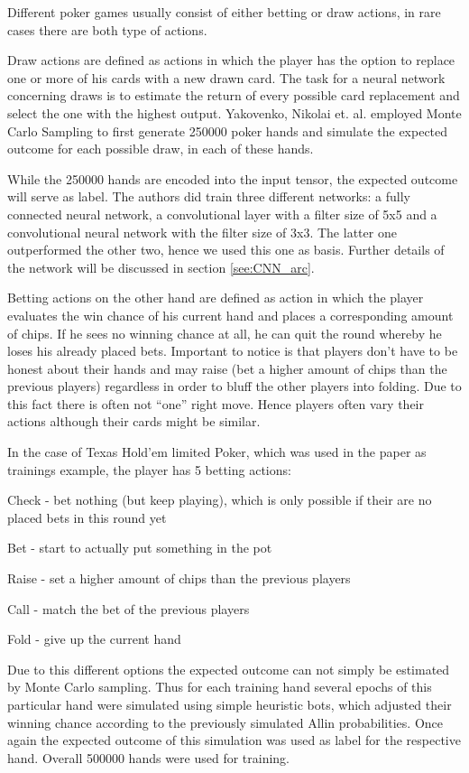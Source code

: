 \documentclass[]{report}
\begin{document}
Different poker games usually consist of either betting or draw actions,
in rare cases there are both type of actions. 

Draw actions are defined as actions in which the player has the option
to replace one or more of his cards with a new drawn card. The task
for a neural network concerning draws is to estimate the return of
every possible card replacement and select the one with the highest
output. Yakovenko, Nikolai et. al. employed Monte Carlo Sampling to
first generate 250000 poker hands and simulate the expected outcome
for each possible draw, in each of these hands.

While the 250000 hands are encoded into the input tensor, the expected
outcome will serve as label. The authors did train three different
networks: a fully connected neural network, a convolutional layer
with a filter size of 5x5 and a convolutional neural network with
the filter size of 3x3. The latter one outperformed the other two,
hence we used this one as basis. Further details of the network will
be discussed in section \ref{see:CNN_arc}. 

Betting actions on the other hand are defined as action in which the
player evaluates the win chance of his current hand and places a corresponding
amount of chips. If he sees no winning chance at all, he can quit the
round whereby he loses his already placed bets. Important to
notice is that players don't have to be honest about their hands and may
raise (bet a higher amount of chips than the previous players) regardless
in order to bluff the other players into folding. Due to this fact
there is often not ``one'' right move. Hence players often vary their
actions although their cards might be similar. 

In the case of Texas Hold'em limited Poker, which was used in the
paper as trainings example, the player has 5 betting actions:

Check - bet nothing (but keep playing), which is only possible if
their are no placed bets in this round yet

Bet - start to actually put something in the pot

Raise - set a higher amount of chips than the previous players

Call - match the bet of the previous players

Fold - give up the current hand

Due to this different options the expected outcome can not simply
be estimated by Monte Carlo sampling. Thus for each training hand
several epochs of this particular hand were simulated using simple heuristic
bots, which adjusted their winning chance according to the previously
simulated Allin probabilities. Once again the expected outcome of
this simulation was used as label for the respective hand. Overall
500000 hands were used for training. 
\end{document}
